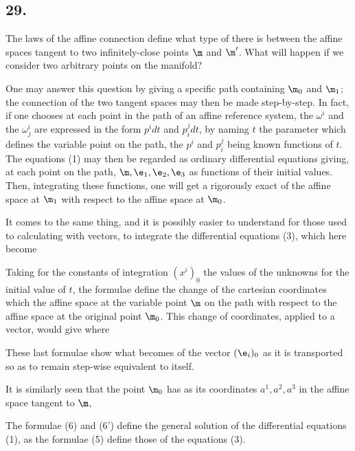 \subsection*{29.}

The laws of the affine connection define what type of  there is between the affine spaces tangent to two infinitely-close points $\m$ and $\m'$. What will happen if we consider two arbitrary points on the manifold?

One may answer this question by giving a specific path containing $\m_0$ and $\m_1$; the connection of the two tangent spaces may then be made step-by-step. In fact, if one chooses at each point in the path of an affine reference system, the $\omega^i$ and the $\omega_j^i$ are expressed in the form $p^i dt$ and $p_i^j dt$, by naming $t$ the parameter which defines the variable point on the path, the $p^i$ and $p_i^j$ being known functions of $t$. The equations (1) may then be regarded as ordinary differential equations giving, at each point on the path, $\m, \e_1, \e_2, \e_3$ as functions of their initial values. Then, integrating these functions, one will get a rigorously exact  of the affine space at $\m_1$ with respect to the affine space at $\m_0$.

It comes to the same thing, and it is possibly easier to understand for those used to calculating with vectors, to integrate the differential equations (3), which here become

Taking for the constants of integration $(x^i)_0$ the values of the unknowns for the initial value of $t$, the formulae
define the change of the cartesian coordinates which  the affine space at the variable point $\m$ on the path with respect to the affine space at the original point $\m_0$. This change of coordinates, applied to a vector, would give
where

These last formulae show what becomes of the vector $(\e_i)_0$ as it is transported so as to remain step-wise equivalent to itself.

It is similarly seen that the point $\m_0$ has as its coordinates $a^1, a^2, a^3$ in the affine space tangent to $\m$,

The formulae (6) and (6') define the general solution of the differential equations (1), as the formulae (5) define those of the equations (3).
%
